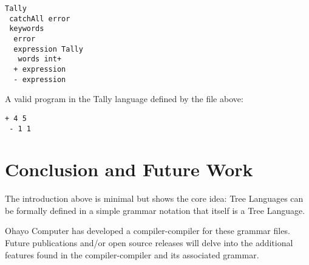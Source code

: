 \documentclass[journal]{IEEEtran}
\begin{document}
\begin{lstlisting}
Tally
 catchAll error
 keywords
  error
  expression Tally
   words int+
  + expression
  - expression
\end{lstlisting}

A valid program in the Tally language defined by the file above:

\begin{lstlisting}
+ 4 5
 - 1 1
\end{lstlisting}

\section{Conclusion and Future Work}

The introduction above is minimal but shows the core idea: Tree Languages can be formally defined in a simple grammar notation that itself is a Tree Language.

Ohayo Computer has developed a compiler-compiler for these grammar files. Future publications and/or open source releases will delve into the additional features found in the compiler-compiler and its associated grammar.
\end{document}
